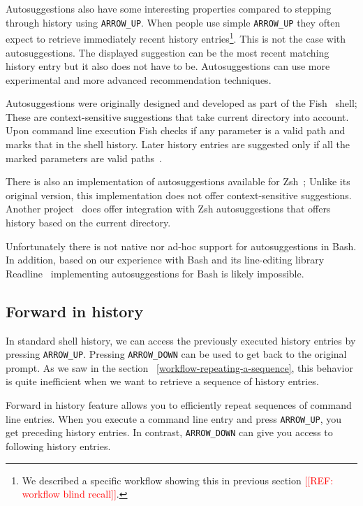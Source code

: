 \documentclass[thesis=M,english]{FITthesis}[2012/10/20]
\newcommand{\redtext}[1]{\textcolor{red}{[[#1]]}}
\let\myCite\cite
\renewcommand\cite{\unskip~\myCite}
\let\myRef\ref
\renewcommand\ref{\unskip~\myRef}
\begin{document}
Autosuggestions also have some interesting properties compared to stepping through history using \verb|ARROW_UP|.
When people use simple \verb|ARROW_UP| they often expect to retrieve immediately recent history entries\footnote{We described a specific workflow showing this in previous section \redtext{REF: workflow blind recall}.}.  This is not the case with autosuggestions. The displayed suggestion can be the most recent matching history entry but it also does not have to be. Autosuggestions can use more experimental and more advanced recommendation techniques.

Autosuggestions were originally designed and developed as part of the Fish\cite{fishdocs} shell; These are context-sensitive suggestions that take current directory into account. Upon command line execution Fish checks if any parameter is a valid path and marks that in the shell history. Later history entries are suggested only if all the marked parameters are valid paths\cite{toolsfishissueautosuggestions}.

There is also an implementation of autosuggestions available for Zsh\cite{toolszshautosuggestions}; Unlike its original version, this implementation does not offer context-sensitive suggestions. Another project\cite{toolszshhistdb} does offer integration with Zsh autosuggestions that offers history based on the current directory.

Unfortunately there is not native nor ad-hoc support for autosuggestions in Bash. In addition, based on our experience with Bash and its line-editing library Readline\cite{ramey2001gnureadline} implementing autosuggestions for Bash is likely impossible.


\subsection{Forward in history}

In standard shell history, we can access the previously executed history entries by pressing \verb|ARROW_UP|. Pressing \verb|ARROW_DOWN| can be used to get back to the original prompt.
As we saw in the section \ref{workflow-repeating-a-sequence}, this behavior is quite inefficient when we want to retrieve a sequence of history entries. %

Forward in history feature allows you to efficiently repeat sequences of command line entries. 
When you execute a command line entry and press \verb|ARROW_UP|, you get preceding history entries. In contrast, \verb|ARROW_DOWN| can give you access to following history entries.
\end{document}

